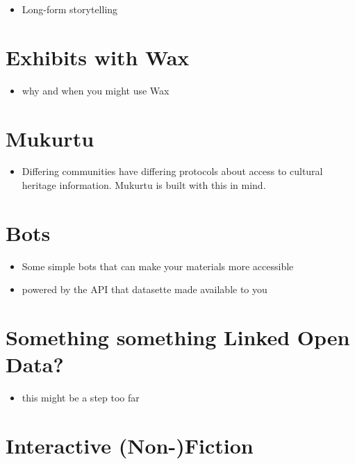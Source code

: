 \documentclass[
]{book}
\providecommand{\tightlist}{%
  \setlength{\itemsep}{0pt}\setlength{\parskip}{0pt}}
\begin{document}
\begin{itemize}
\tightlist
\item
  Long-form storytelling
\end{itemize}

\hypertarget{wax}{%
\section{Exhibits with Wax}\label{wax}}

\begin{itemize}
\tightlist
\item
  why and when you might use Wax
\end{itemize}

\hypertarget{mukurtu}{%
\section{Mukurtu}\label{mukurtu}}

\begin{itemize}
\tightlist
\item
  Differing communities have differing protocols about access to cultural heritage information. Mukurtu is built with this in mind.
\end{itemize}

\hypertarget{bots}{%
\section{Bots}\label{bots}}

\begin{itemize}
\tightlist
\item
  Some simple bots that can make your materials more accessible
\item
  powered by the API that datasette made available to you
\end{itemize}

\hypertarget{something-something-linked-open-data}{%
\section{Something something Linked Open Data?}\label{something-something-linked-open-data}}

\begin{itemize}
\tightlist
\item
  this might be a step too far
\end{itemize}

\hypertarget{interactive-stories}{%
\section{Interactive (Non-)Fiction}\label{interactive-stories}}
\end{document}
